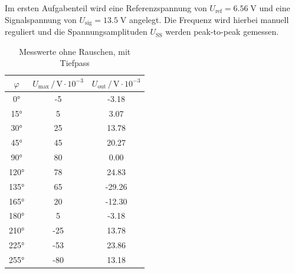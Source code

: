 Im ersten Aufgabenteil wird eine Referenzspannung von $U_\text{ref}=6.56 \;\si{\volt}$
und eine Signalspannung von $U_\text{sig}=13.5 \;\si{\volt}$ angelegt.
Die Frequenz wird hierbei manuell reguliert und die Spannungsamplituden
$U_\text{SS}$ werden peak-to-peak gemessen.


\begin{table}[!h]
  \centering
    \begin{tabular}{S[table-format=4.0]SS}
      \toprule
      {$\varphi$} &
      {$U_\text{max} \,/\, \si{\volt}\cdot10^{-3}$} &
      {$U_\text{out} \,/\, \si{\volt}\cdot10^{-3}$} \\
      \si{\degree}    &    -5     &     -3.18 \\
     15\si{\degree}    &     5     &      3.07 \\
     30\si{\degree}    &    25     &     13.78 \\
     45\si{\degree}    &    45     &     20.27 \\
     90\si{\degree}    &    80     &      0.00 \\
    120\si{\degree}    &    78     &     24.83 \\
    135\si{\degree}    &    65     &    -29.26 \\
    165\si{\degree}    &    20     &    -12.30 \\
    180\si{\degree}    &    5      &     -3.18 \\
    210\si{\degree}    &    -25    &     13.78 \\
    225\si{\degree}    &    -53    &     23.86 \\
    255\si{\degree}    &    -80    &     13.18 \\
    \bottomrule
    \end{tabular}
    \label{tab:b}
  \caption{Messwerte ohne Rauschen, mit Tiefpass}
  \quad
  \hfill
\end{table}


